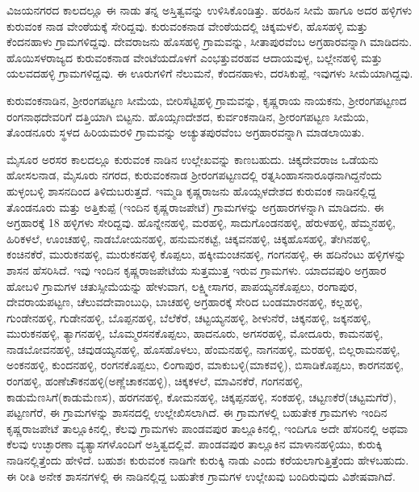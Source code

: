 ವಿಜಯನಗರದ ಕಾಲದಲ್ಲೂ ಈ ನಾಡು ತನ್ನ ಅಸ್ತಿತ್ವವನ್ನು ಉಳಿಸಿಕೊಂಡಿತ್ತು. ಹರಹಿನ ಸೀಮೆ ಹಾಗೂ ಅದರ ಹಳ್ಳಿಗಳು ಕುರುವಂಕ ನಾಡ ವೇಂಠೆಯಕ್ಕೆ ಸೇರಿದ್ದವು. ಕುರುವಂಕನಾಡ ವೇಂಠೆಯದಲ್ಲಿ ಚಿಕ್ಕಮಳಲಿ, ಹೊಸಹಳ್ಳಿ ಮತ್ತು ಕೆಂದನಹಾಳು ಗ್ರಾಮಗಳಿದ್ದವು. ದೇವರಾಜನು ಹೊಸಹಳ್ಳಿ ಗ್ರಾಮವನ್ನು, ಸೀತಾಪುರವೆಂಬ ಅಗ್ರಹಾರವನ್ನಾಗಿ ಮಾಡಿದನು. ಹೊಯಿಸಳರಾಜ್ಯದ ಕುರುವಂಕನಾಡ ವೇಂಟೆಯದೊಳಗೆ ಎಂಭತ್ತುವರಹವ ಆದಾಯವುಳ್ಳ, ಬಲ್ಲೇನಹಳ್ಳಿ ಮತ್ತು ಯಲವದಹಳ್ಳಿ ಗ್ರಾಮಗಳಿದ್ದವು. ಈ ಊರುಗಳಿಗೆ ನೆಲುಮನೆ, ಕೆಂದನಹಾಳು, ದರಸಿಕುಪ್ಪೆ, ಇವುಗಳು ಸೀಮೆಯಾಗಿದ್ದವು.

ಕುರುವಂಕನಾಡಿನ, ಶ‍್ರೀರಂಗಪಟ್ಟಣ ಸೀಮೆಯ, ಬೀರಿಸೆಟ್ಟಿಹಳ್ಳಿ ಗ್ರಾಮವನ್ನು, ಕೃಷ್ಣರಾಯ ನಾಯಕನು, ಶ‍್ರೀರಂಗಪಟ್ಟಣದ ರಂಗನಾಥದೇವರಿಗೆ ದತ್ತಿಯಾಗಿ ಬಿಟ್ಟನು. ಹೊಯ್ಸಣದೇಶದ, ಕುರ್ವಂಕನಾಡಿನ, ಶ‍್ರೀರಂಗಪಟ್ಟಣ ಸೀಮೆಯ, ತೊಂಡನೂರು ಸ್ಥಳದ ಹಿರಿಯಮರಳಿ ಗ್ರಾಮವನ್ನು ಅಚ್ಯುತಪುರವೆಂಬ ಅಗ್ರಹಾರವನ್ನಾಗಿ ಮಾಡಲಾಯಿತು.

ಮೈಸೂರ ಅರಸರ ಕಾಲದಲ್ಲೂ ಕುರುವಂಕ ನಾಡಿನ ಉಲ್ಲೇಖವನ್ನು ಕಾಣಬಹುದು. ಚಿಕ್ಕದೇವರಾಜ ಒಡೆಯನು ಹೋಸಲನಾಡ, ಮೈಸೂರು ನಗರದ, ಕುರುವಂಕನಾಡ ಶ‍್ರೀರಂಗಪಟ್ಟಣದಲ್ಲಿ ರತ್ನಸಿಂಹಾಸನಾರೂಢನಾಗಿದ್ದನೆಂದು ಹುಳ್ಳಂಬಳ್ಳಿ ಶಾಸನದಿಂದ ತಿಳಿದುಬರುತ್ತದೆ. ಇಮ್ಮಡಿ ಕೃಷ್ಣರಾಜನು ಹೊಯ್ಸಳದೇಶದ ಕುರುವಂಕ ನಾಡಿನಲ್ಲಿದ್ದ ತೊಂಡನೂರು ಮತ್ತು ಅತ್ತಿಕುಪ್ಪೆ (ಇಂದಿನ ಕೃಷ್ಣರಾಜಪೇಟೆ) ಗ್ರಾಮಗಳನ್ನು ಅಗ್ರಹಾರಗಳನ್ನಾಗಿ ಮಾಡಿದನು. ಈ ಅಗ್ರಹಾರಕ್ಕೆ 18 ಹಳ್ಳಿಗಳು ಸೇರಿದ್ದವು. ಹೊನ್ನೇನಹಳ್ಳಿ, ಮರಹಳ್ಳಿ, ಸಾದುಗೊಂಡನಹಳ್ಳಿ, ಹೆರುಳಹಳ್ಳಿ, ಹೆಮ್ಮನಹಳ್ಳಿ, ಹಿರಿಕಳಲೆ, ಊಂಚಹಳ್ಳಿ, ನಾಡಬೋಯನಹಳ್ಳಿ, ಹನುಮನಕಟ್ಟೆ, ಚಿಕ್ಕವನಹಳ್ಳಿ, ಚಿಕ್ಕಹೊಸಹಳ್ಳಿ, ತೇಗಿನಹಳ್ಳಿ, ಕಂಚಿನಕೆರೆ, ಮುರುಕನಹಳ್ಳಿ, ಮುರುಕನಹಳ್ಳಿ ಕೊಪ್ಪಲು, ಹಕ್ಕೀಮಂಚನಹಳ್ಳಿ, ಗಂಗನಹಳ್ಳಿ, ಈ ಹದಿನೆಂಟು ಹಳ್ಳಿಗಳನ್ನು ಶಾಸನ ಹೆಸರಿಸಿದೆ. ಇವು ಇಂದಿನ ಕೃಷ್ಣರಾಜಪೇಟೆಯ ಸುತ್ತಮುತ್ತ ಇರುವ ಗ್ರಾಮಗಳು. ಯಾದವಪುರಿ ಅಗ್ರಹಾರ ಹೋಬಳಿ ಗ್ರಾಮಗಳ ಚತುಸ್ಸೀಮೆಯನ್ನು ಹೇಳುವಾಗ, ಲಕ್ಷ್ಮೀಸಾಗರ, ಪಾಪಯ್ಯನಕೊಪ್ಪಲು, ರಂಗಾಪುರ, ದೇವರಾಯಪಟ್ಟಣ, ಚೆಲುವದೇವಾಂಬುಧಿ, ಬಾಚಹಳ್ಳಿ ಅಗ್ರಹಾರಕ್ಕೆ ಸೇರಿದ ಬಂಡಮಾರನಹಳ್ಳಿ, ಕಲ್ಲಹಳ್ಳಿ, ಗುಂಡೇನಹಳ್ಳಿ, ಗುಡೇನಹಳ್ಳಿ, ಬೊಪ್ಪನಹಳ್ಳಿ, ಬೆಲೆಕೆರೆ, ಚಟ್ಟಯ್ಯನಹಳ್ಳಿ, ಶೀಳುನೆರೆ, ಚಿಕ್ಕನಹಳ್ಳಿ, ಜಕ್ಕನಹಳ್ಳಿ, ಮುರುಕನಹಳ್ಳಿ, ತ್ಯಾಗನಹಳ್ಳಿ, ಬೊಮ್ಮರಸನಕೊಪ್ಪಲು, ಹಾದನೂರು, ಅಗಸರಹಳ್ಳಿ, ಮೋದೂರು, ಕಾಮನಹಳ್ಳಿ, ನಾಡಬೋವನಹಳ್ಳಿ, ಚವುಡಯ್ಯನಹಳ್ಳಿ, ಹೊಸಹೊಳಲು, ಹೆಂಮನಹಳ್ಳಿ, ನಾಗನಹಳ್ಳಿ, ಮರಹಳ್ಳಿ, ಬಿಲ್ಲರಾಮನಹಳ್ಳಿ, ಅಂಕನಹಳ್ಳಿ, ಕುಂದನಹಳ್ಳಿ, ರಂಗನಕೊಪ್ಪಲು, ಲಿಂಗಾಪುರ, ಮಾಕುಬಳ್ಳಿ(ಮಾಕವಳ್ಳಿ), ಬಿಸಾಡಿಕೊಪ್ಪಲು, ಕಾರಗನಹಳ್ಳಿ, ರಂಗಹಳ್ಳಿ, ಹಂಣೆಚೌಕನಹಳ್ಳಿ(ಅಣ್ಣೆಚಾಕನಹಳ್ಳಿ), ಚಿಕ್ಕಕಳಲೆ, ಮಾವಿನಕೆರೆ, ಗಂಗನಹಳ್ಳಿ, ಕಾಡುಮೆಣಸಿಗೆ(ಕಾಡುಮೆಣಸ), ಹರಗನಹಳ್ಳಿ, ಕೋಮನಹಳ್ಳಿ, ಚಿಕ್ಕಪ್ಪನಹಳ್ಳಿ, ಸಂಕಹಳ್ಳಿ, ಚಟ್ಟಣಕೆರೆ(ಚಟ್ಟಮಗೆರೆ), ಪಟ್ಟಣಗೆರೆ, ಈ ಗ್ರಾಮಗಳನ್ನು ಶಾಸನದಲ್ಲಿ ಉಲ್ಲೇಖಿಸಲಾಗಿದೆ. ಈ ಗ್ರಾಮಗಳಲ್ಲಿ ಬಹುತೇಕ ಗ್ರಾಮಗಳು ಇಂದಿನ ಕೃಷ್ಣರಾಜಪೇಟೆ ತಾಲ್ಲೂಕಿನಲ್ಲಿ, ಕೆಲವು ಗ್ರಾಮಗಳು ಪಾಂಡವಪುರ ತಾಲ್ಲೂಕಿನಲ್ಲಿ, ಇಂದಿಗೂ ಅದೇ ಹೆಸರಿನಲ್ಲಿ ಅಥವಾ ಕೆಲವು ಉಚ್ಛಾರಣಾ ವ್ಯತ್ಯಾಸಗಳೊಂದಿಗೆ ಅಸ್ತಿತ್ವದಲ್ಲಿವೆ. ಪಾಂಡವಪುರ ತಾಲ್ಲೂಕಿನ ಮಾಳಾನಹಳ್ಳಿಯು, ಕುರುಕ್ಕಿ ನಾಡಿನಲ್ಲಿತ್ತೆಂದು ಹೇಳಿದೆ. ಬಹುಶಃ ಕುರುವಂಕ ನಾಡಿಗೇ ಕುರುಕ್ಕಿ ನಾಡು ಎಂದು ಕರೆಯಲಾಗುತ್ತಿತ್ತೆಂದು ಹೇಳಬಹುದು. ಈ ರೀತಿ ಅನೇಕ ಶಾಸನಗಳಲ್ಲಿ ಈ ನಾಡಿನಲ್ಲಿದ್ದ ಬಹುತೇಕ ಗ್ರಾಮಗಳ ಉಲ್ಲೇಖವು ಬಂದಿರುವುದು ವಿಶೇಷವಾಗಿದೆ.

